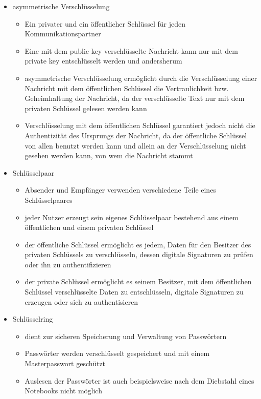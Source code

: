\documentclass[12pt,a4paper]{article}
\begin{document}
\begin{itemize}
    \item asymmetrische Verschlüsselung
    \begin{itemize}
        \item Ein privater und ein öffentlicher Schlüssel für jeden Kommunikationspartner 
	    \item Eine mit dem public key verschlüsselte Nachricht kann nur mit dem private key entschlüsselt werden und andersherum
	    \item  asymmetrische Verschlüsselung ermöglicht durch die Verschlüsselung einer Nachricht mit dem öffentlichen Schlüssel die Vertraulichkeit bzw. Geheimhaltung der Nachricht, da der verschlüsselte Text nur mit dem privaten Schlüssel gelesen werden kann
	    \item Verschlüsselung mit dem öffentlichen Schlüssel garantiert jedoch nicht die Authentizität des Ursprungs der Nachricht, da der öffentliche Schlüssel von allen benutzt werden kann und allein an der Verschlüsselung nicht gesehen werden kann, von wem die Nachricht stammt
    \end{itemize}
    \item Schlüsselpaar
    \begin{itemize}
        \item Absender und Empfänger verwenden verschiedene Teile eines Schlüsselpaares
        \item jeder Nutzer erzeugt sein eigenes Schlüsselpaar bestehend aus einem öffentlichen und einem privaten Schlüssel
        \item der öffentliche Schlüssel ermöglicht es jedem, Daten für den Besitzer des privaten Schlüssels zu verschlüsseln, dessen digitale Signaturen zu prüfen oder ihn zu authentifizieren
        \item der private Schlüssel ermöglicht es seinem Besitzer, mit dem öffentlichen Schlüssel verschlüsselte Daten zu entschlüsseln, digitale Signaturen zu erzeugen oder sich zu authentisieren
    \end{itemize}
    \item Schlüsselring
    \begin{itemize}
        \item dient zur sicheren Speicherung und Verwaltung von Passwörtern
        \item Passwörter werden verschlüsselt gespeichert und mit einem Masterpasswort geschützt
        \item Auslesen der Passwörter ist auch beispielsweise nach dem Diebstahl eines Notebooks nicht möglich

\end{itemize}
\end{itemize}
\end{document}
